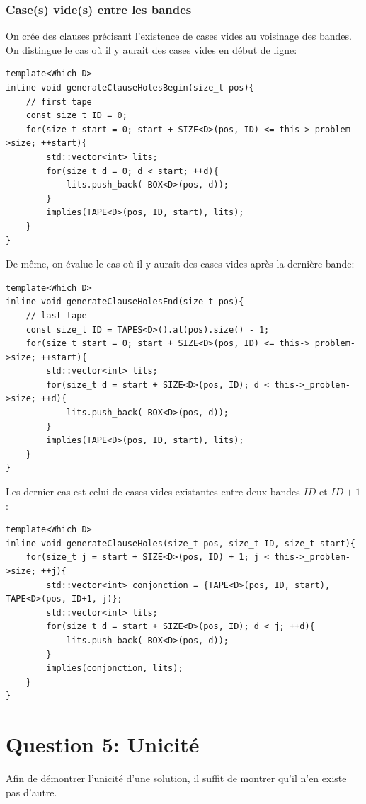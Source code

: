 \documentclass[a4paper,12pt]{report}
\begin{document}
\subsection{Case(s) vide(s) entre les bandes}
On crée des clauses précisant l'existence de cases vides au voisinage des bandes.\\
On distingue le cas où il y aurait des cases vides en début de ligne:
\begin{lstlisting}[mathescape=true]
template<Which D>
inline void generateClauseHolesBegin(size_t pos){
	// first tape	
	const size_t ID = 0;
	for(size_t start = 0; start + SIZE<D>(pos, ID) <= this->_problem->size; ++start){
		std::vector<int> lits;
		for(size_t d = 0; d < start; ++d){
			lits.push_back(-BOX<D>(pos, d));
		}
		implies(TAPE<D>(pos, ID, start), lits);	
	}
}
\end{lstlisting}
De même, on évalue le cas où il y aurait des cases vides après la dernière bande:
\lstset{style=Cpp, caption=Cases vides après la dernière bande, label=C:HoleEnd}
\begin{lstlisting}[mathescape=true]
template<Which D>
inline void generateClauseHolesEnd(size_t pos){
	// last tape
	const size_t ID = TAPES<D>().at(pos).size() - 1;
	for(size_t start = 0; start + SIZE<D>(pos, ID) <= this->_problem->size; ++start){
		std::vector<int> lits;
		for(size_t d = start + SIZE<D>(pos, ID); d < this->_problem->size; ++d){
			lits.push_back(-BOX<D>(pos, d));
		}
		implies(TAPE<D>(pos, ID, start), lits);	
	}
}
\end{lstlisting}

Les dernier cas est celui de cases vides existantes entre deux bandes $ID$ et $ID+1$:
\lstset{style=Cpp, caption=Cases vides entre 2 bandes, label=C:HoleBetween}
\begin{lstlisting}[mathescape=true]
template<Which D>
inline void generateClauseHoles(size_t pos, size_t ID, size_t start){
	for(size_t j = start + SIZE<D>(pos, ID) + 1; j < this->_problem->size; ++j){
		std::vector<int> conjonction = {TAPE<D>(pos, ID, start), TAPE<D>(pos, ID+1, j)};
		std::vector<int> lits;
		for(size_t d = start + SIZE<D>(pos, ID); d < j; ++d){
			lits.push_back(-BOX<D>(pos, d));
		}
		implies(conjonction, lits);
	}
}
\end{lstlisting}

\chapter{Question 5: Unicité}
Afin de démontrer l'unicité d'une solution, il suffit de montrer qu'il n'en existe pas d'autre.\\
\end{document}
